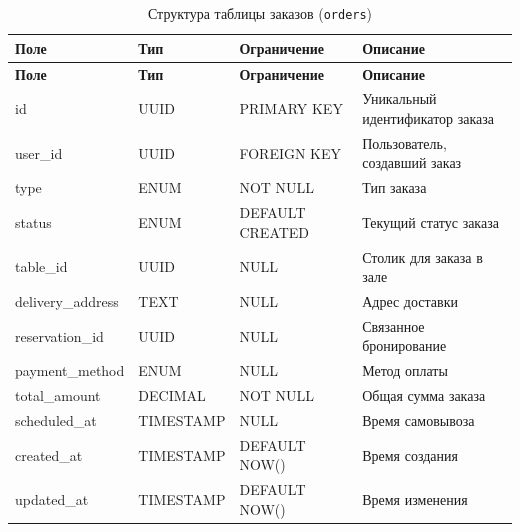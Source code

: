 \begin{longtable}{|l|l|p{3.5cm}|p{5.5cm}|}
	\caption{Структура таблицы заказов (\texttt{orders})}
	\label{tab:orders}                                                                                                      \\

	\hline
	\textbf{Поле}      & \textbf{Тип} & \textbf{Ограничение} & \textbf{Описание}                    \\ \hline
	\endfirsthead

	\hline
	\textbf{Поле}      & \textbf{Тип} & \textbf{Ограничение} & \textbf{Описание}                    \\ \hline
	\endhead

	id                  & UUID         & PRIMARY KEY          & Уникальный идентификатор заказа      \\ \hline
	user\_id            & UUID         & FOREIGN KEY          & Пользователь, создавший заказ        \\ \hline
	type                & ENUM         & NOT NULL             & Тип заказа                           \\ \hline
	status              & ENUM         & DEFAULT CREATED      & Текущий статус заказа                \\ \hline
	table\_id           & UUID         & NULL                 & Столик для заказа в зале             \\ \hline
	delivery\_address   & TEXT         & NULL                 & Адрес доставки                       \\ \hline
	reservation\_id     & UUID         & NULL                 & Связанное бронирование               \\ \hline
	payment\_method     & ENUM         & NULL                 & Метод оплаты                         \\ \hline
	total\_amount       & DECIMAL      & NOT NULL             & Общая сумма заказа                   \\ \hline
	scheduled\_at       & TIMESTAMP    & NULL                 & Время самовывоза                     \\ \hline
	created\_at         & TIMESTAMP    & DEFAULT NOW()        & Время создания                       \\ \hline
	updated\_at         & TIMESTAMP    & DEFAULT NOW()        & Время изменения                      \\ \hline
\end{longtable}

